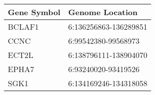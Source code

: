 \begin{tabular}{ll}
\toprule
Gene Symbol &       Genome Location \\
\midrule
     BCLAF1 & 6:136256863-136289851 \\
       CCNC &   6:99542380-99568973 \\
      ECT2L & 6:138796111-138904070 \\
      EPHA7 &   6:93240020-93419526 \\
       SGK1 & 6:134169246-134318058 \\
\bottomrule
\end{tabular}
